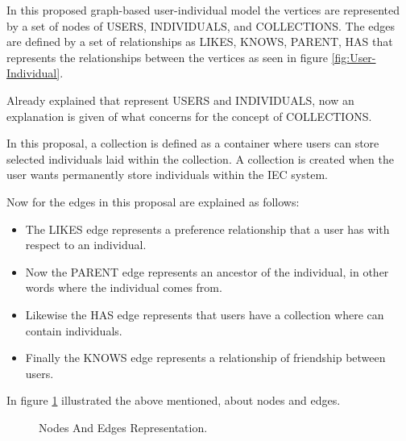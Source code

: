In this proposed graph-based user-individual model the vertices are represented by a set of nodes 
of USERS, INDIVIDUALS, and COLLECTIONS. The edges are defined by a set of relationships as LIKES, 
KNOWS, PARENT, HAS that represents the relationships between the vertices as seen in figure \ref{fig:User-Individual}.

Already explained that represent USERS and INDIVIDUALS, now an explanation is
given of what concerns for the concept of COLLECTIONS.

In this proposal, a collection is defined as a container where users can store selected individuals 
laid within the collection. A collection is created when the user wants permanently store individuals 
within the IEC system.


Now for the edges in this proposal are explained as follows:

\begin{itemize}
\item The  LIKES edge represents a preference relationship that a user has with respect to an individual.
\item Now the  PARENT edge represents an ancestor of the individual, in other words where the individual comes from.
\item Likewise the  HAS edge represents that users have a collection where can contain individuals.
\item Finally the KNOWS edge represents a relationship of friendship between users.
\end{itemize}

In figure \ref{fig:Nodes_Edges} illustrated the above mentioned, about nodes and edges.

\begin{figure}
\captionsetup{justification=centering,margin=2cm}
\centering
\setlength\fboxsep{0pt}
\setlength\fboxrule{0.7pt}
\caption{Nodes And Edges Representation.}
\label{fig:Nodes_Edges}
\end{figure}


